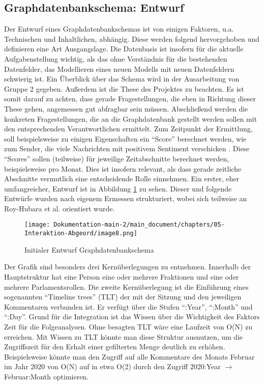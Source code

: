 \subsection{Graphdatenbankschema: Entwurf}
Der Entwurf eines Graphdatenbankschemas ist von einigen Faktoren, u.a. Technischen und Inhaltlichen, abhängig. Diese werden folgend hervorgehoben und definieren eine Art Ausgangslage.
\newline
Die Datenbasis ist insofern für die aktuelle Aufgabenstellung wichtig, als das ohne Verständnis für die bestehenden Datenfelder, das Modellieren eines neuen Modells mit neuen Datenfeldern schwierig ist. Ein Überblick über das Schema wird in der Ausarbeitung von Gruppe 2 gegeben.
Außerdem ist die These des Projektes zu beachten. Es ist somit darauf zu achten, dass gerade Fragestellungen, die eben in Richtung dieser These gehen, angemessen gut abfragbar sein müssen.
\newline
Abschließend werden die konkreten Fragestellungen, die an die Graphdatenbank gestellt werden sollen mit den entsprechenden Verantwortlichen ermittelt. Zum Zeitpunkt der Ermittlung, soll beispielsweise zu einigen Eigenschaften ein \enquote{Score} berechnet werden, wie zum Sender, die viele Nachrichten mit positivem Sentiment verschicken \cite{initialQuestionsGroup7}. Diese \enquote{Scores} sollen (teilweise) für jeweilige Zeitabschnitte berechnet werden, beispielsweise pro Monat. Dies ist insofern relevant, als dass gerade zeitliche Abschnitte vermutlich eine entscheidende Rolle einnehmen.
\newline
Ein erster, eher umfangreicher, Entwurf ist in Abbildung \ref{fig:Dokumentation-main-2/main_document/chapters/05-Interaktion-Abgeord/image8.png} zu sehen. Dieser und folgende Entwürfe wurden nach eigenem Ermessen strukturiert, wobei sich teilweise an Roy-Hubara et al. \cite{graphdatabasemodelling} orientiert wurde.
\begin{figure}[hbt!]
    \centering
    \texttt{[image: Dokumentation-main-2/main\_document/chapters/05-Interaktion-Abgeord/image8.png]}
    \caption{Initialer Entwurf Graphdatenbankschema}
    \label{fig:Dokumentation-main-2/main_document/chapters/05-Interaktion-Abgeord/image8.png}
\end{figure}
Der Grafik sind besonders drei Kernüberlegungen zu entnehmen. Innerhalb der Hauptstruktur hat eine Person eine oder mehrere Fraktionen und eine oder mehrere Parlamentsrollen. Die zweite Kernüberlegung ist die Einführung eines sogenannten \enquote{Timeline trees} (TLT) \cite{robinson2015graph} der mit der Sitzung und den jeweiligen Kommentaren verbunden ist. Er verfügt über die Stufen \enquote{:Year}, \enquote{:Month} und \enquote{:Day}. Grund für die Integration ist das Wissen über die Wichtigkeit des Faktors Zeit für die Folgeanalysen. Ohne besagten TLT wäre eine Laufzeit von O(N) zu erreichen. Mit Wissen zu TLT könnte man diese Struktur ausnutzen, um die Zugriffszeit für den Erhalt einer gefilterten Menge deutlich zu erhöhen. Beispielsweise könnte man den Zugriff auf alle Kommentare des Monats Februar im Jahr 2020 von O(N) auf in etwa O(2) durch den Zugriff 2020:Year $\rightarrow$ Februar:Month optimieren.
